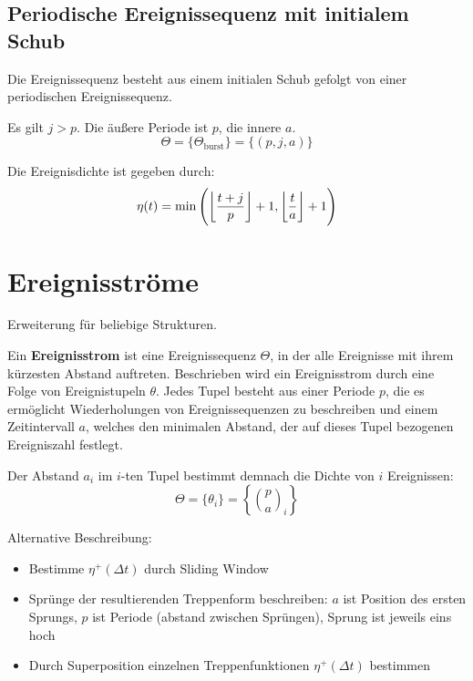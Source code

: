 \subsection{Periodische Ereignissequenz mit initialem Schub}
Die Ereignissequenz besteht aus einem initialen Schub gefolgt von einer periodischen
Ereignissequenz.

Es gilt $j>p$. Die äußere Periode ist $p$, die innere $a$.
\begin{equation}
    \Theta = \{\Theta_\text{burst}\} = \{(p, j, a)\}
\end{equation}

Die Ereignisdichte ist gegeben durch:
\begin{equation}
    \eta(t) = \min\left(\floor*{\frac{t+j}{p}} + 1, \floor*{\frac{t}{a}} + 1\right)
\end{equation}

\section{Ereignisströme}
Erweiterung für beliebige Strukturen.

\begin{tcolorbox}
Ein \textbf{Ereignisstrom} ist eine Ereignissequenz $\Theta$, in der alle Ereignisse
mit ihrem kürzesten Abstand auftreten. Beschrieben wird ein Ereignisstrom durch eine
Folge von Ereignistupeln $\theta$. Jedes Tupel besteht aus einer Periode $p$, die
es ermöglicht Wiederholungen von Ereignissequenzen zu beschreiben und einem Zeitintervall
$a$, welches den minimalen Abstand, der auf dieses Tupel bezogenen Ereigniszahl festlegt.

Der Abstand $a_i$ im $i$-ten Tupel bestimmt demnach die Dichte von $i$ Ereignissen:
\begin{equation}
    \Theta = \{\theta_i\} = \left\{ \binom{p}{a}_i\right\}
\end{equation}
\end{tcolorbox}

Alternative Beschreibung:
\begin{itemize}
    \item Bestimme $\eta^+(\Delta t)$ durch Sliding Window
    \item Sprünge der resultierenden Treppenform beschreiben:
        $a$ ist Position des ersten Sprungs, $p$ ist Periode (abstand zwischen Sprüngen), Sprung ist jeweils eins hoch
    \item Durch Superposition einzelnen Treppenfunktionen $\eta^+(\Delta t)$
        bestimmen
\end{itemize}

